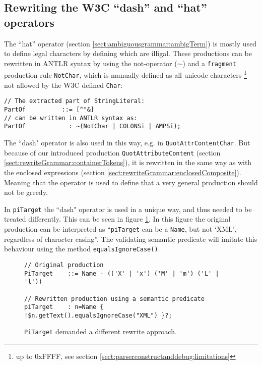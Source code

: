\subsection{Rewriting the W3C ``dash'' and ``hat'' operators}
\label{sect:implementation:dashOperator}
The ``hat'' operator (section \ref{sect:ambiguousgrammar:ambigTerm}) is mostly used to define legal characters by defining which are illigal. These productions can be rewritten in ANTLR syntax by using the not-operator ($\sim$) and a \verb!fragment! production rule \verb!NotChar!, which is manually defined as all unicode characters \footnote{up to 0xFFFF, see section \ref{sect:parserconstructanddebug:limitations}} not allowed by the W3C defined \verb!Char!:
\begin{Verbatim}
// The extracted part of StringLiteral:
PartOf          ::= [^"&]
// can be written in ANTLR syntax as:
PartOf            : ~(NotChar | COLONSi | AMPSi);
\end{Verbatim}
The ``dash" operator is also used in this way, e.g. in \verb!QuotAttrContentChar!. But because of our introduced production \verb!QuotAttributeContent! (section \ref{sect:rewriteGrammar:containerTokens}), it is rewritten in the same way as with the enclosed expressions (section \ref{sect:rewriteGrammar:enclosedComposite}). Meaning that the operator is used to define that a very general production should not be greedy. 

In \verb!piTarget! the ``dash" operator is used in a unique way, and thus needed to be treated differently. This can be seen in figure \ref{fig:pitargetRewritten}. In this figure the original production can be interpreted as ``\texttt{piTarget} can be a \texttt{Name}, but not `XML', regardless of character casing''. The validating semantic predicate will imitate this behaviour using the method \verb!equalsIgnoreCase()!.
\begin{figure}[h!]
\begin{Verbatim}
// Original production
PiTarget    ::= Name - (('X' | 'x') ('M' | 'm') ('L' | 'l'))

// Rewritten production using a semantic predicate
piTarget    : n=Name { !$n.getText().equalsIgnoreCase("XML") }?;
\end{Verbatim}
\caption[Rewrite of 'dash' operator]{\texttt{PiTarget} demanded a different rewrite approach.}
\label{fig:pitargetRewritten}
\end{figure}


